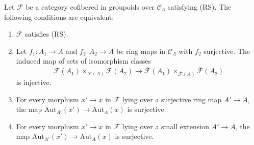 \begin{lemma}
\label{lemma-RS-associated-functor}
Let $\mathcal{F}$ be a category cofibered in groupoids over
$\mathcal{C}_\Lambda$ satisfying (RS).
The following conditions are equivalent:
\begin{enumerate}
\item $\overline{\mathcal{F}}$ satisfies (RS).
\item Let $f_1: A_1 \to A$ and $f_2: A_2 \to A$ be ring maps in
$\mathcal{C}_\Lambda$ with $f_2$ surjective. The induced map
of sets of isomorphism classes
$$
\overline{\mathcal{F}(A_1) \times_{\mathcal{F}(A)} \mathcal{F}(A_2)}
\to \overline{\mathcal{F}}(A_1) \times_{\overline{\mathcal{F}}(A)}
\overline{\mathcal{F}}(A_2)
$$
is injective.
\item For every morphism $x' \to x$ in $\mathcal{F}$ lying over a
surjective ring map $A' \to A$, the map
$\text{Aut}_{A'}(x') \to \text{Aut}_A(x)$ is surjective.
\item For every morphism $x' \to x$ in $\mathcal{F}$ lying over a small
extension $A' \to A$, the map
$\text{Aut}_{A'}(x') \to \text{Aut}_A(x)$ is surjective.
\end{enumerate}
\end{lemma}

